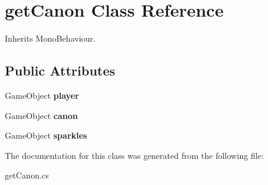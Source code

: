 \hypertarget{classget_canon}{\section{get\+Canon Class Reference}
\label{classget_canon}
}


Inherits Mono\+Behaviour.

\subsection*{Public Attributes}
\begin{DoxyCompactItemize}
\item 
\hypertarget{classget_canon_a4a2738b24334055038902a6c681c2b72}{Game\+Object {\bfseries player}}\label{classget_canon_a4a2738b24334055038902a6c681c2b72}

\item 
\hypertarget{classget_canon_a23cace381e6155162a5e60e09dd039b6}{Game\+Object {\bfseries canon}}\label{classget_canon_a23cace381e6155162a5e60e09dd039b6}

\item 
\hypertarget{classget_canon_ac87c45ebb78072bb0fa00ca0e96cac2f}{Game\+Object {\bfseries sparkles}}\label{classget_canon_ac87c45ebb78072bb0fa00ca0e96cac2f}

\end{DoxyCompactItemize}


The documentation for this class was generated from the following file\+:\begin{DoxyCompactItemize}
\item 
get\+Canon.\+cs\end{DoxyCompactItemize}
